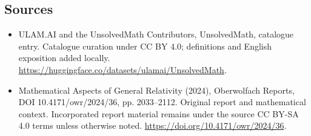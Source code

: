 \documentclass[11pt]{article}
\begin{document}
\subsection{Sources}
\begin{itemize}
\item[\hypertarget{source:statement:1}{S1}] ULAM.AI and the UnsolvedMath Contributors, UnsolvedMath, catalogue entry. Catalogue curation under CC BY 4.0; definitions and English exposition added locally.
\url{https://huggingface.co/datasets/ulamai/UnsolvedMath}.
\item[\hypertarget{source:statement:2}{S2}] Mathematical Aspects of General Relativity (2024), Oberwolfach Reports, DOI 10.4171/owr/2024/36, pp. 2033--2112. Original report and mathematical context. Incorporated report material remains under the source CC BY-SA 4.0 terms unless otherwise noted.
\url{https://doi.org/10.4171/owr/2024/36}.
\end{itemize}
\label{end:statement}
\end{document}
